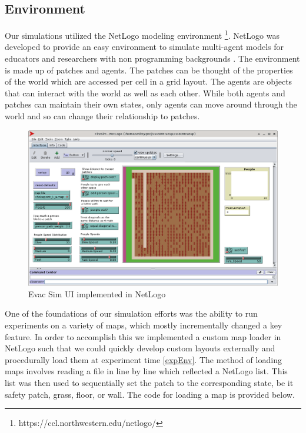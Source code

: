 \documentclass[12pt,letterpaper]{article}
\begin{document}
\subsection{Environment} \label{Environment}

Our simulations utilized the NetLogo modeling environment \footnote{https://ccl.northwestern.edu/netlogo/}.  NetLogo was developed to provide an easy environment to simulate multi-agent models for educators and researchers with non programming backgrounds \cite{netlogo}.  The environment is made up of patches and agents.  The patches can be thought of the properties of the world which are accessed per cell in a grid layout.  The agents are objects that can interact with the world as well as each other.  While both agents and patches can maintain their own states, only agents can move around through the world and so can change their relationship to patches.


\begin{figure}[!h]
  \centering
  \includegraphics[width=.75\linewidth]{./figures/fire_sim_ui.png}
  \caption{Evac Sim UI implemented in NetLogo}
\end{figure}

One of the foundations of our simulation efforts was the ability to run experiments on a variety of maps, which mostly incrementally changed a key feature.  In order to accomplish this we implemented a custom map loader in NetLogo such that we could quickly develop custom layouts externally and procedurally load them at experiment time \ref{expEnv}.  The method of loading maps involves reading a file in line by  line which reflected a NetLogo list.  This list was then used to sequentially set the patch to the corresponding state, be it safety patch, grass, floor, or wall.  The code for loading a map is provided below.
\end{document}
